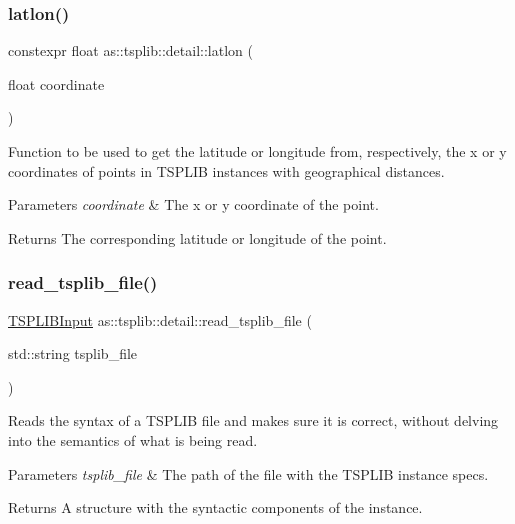 \subsubsection{\texorpdfstring{latlon()}{latlon()}}
{\footnotesize\ttfamily constexpr float as\+::tsplib\+::detail\+::latlon (\begin{DoxyParamCaption}\item[{float}]{coordinate }\end{DoxyParamCaption})\hspace{0.3cm}{\ttfamily [inline]}}



Function to be used to get the latitude or longitude from, respectively, the x or y coordinates of points in T\+S\+P\+L\+IB instances with geographical distances. 


\begin{DoxyParams}{Parameters}
{\em coordinate} & The x or y coordinate of the point. \\
\hline
\end{DoxyParams}
\begin{DoxyReturn}{Returns}
The corresponding latitude or longitude of the point. 
\end{DoxyReturn}
\mbox{\label{namespaceas_1_1tsplib_1_1detail_a3fabd21c4bc13069fbe2bcb9b6c59e74}} 
\subsubsection{\texorpdfstring{read\+\_\+tsplib\+\_\+file()}{read\_tsplib\_file()}}
{\footnotesize\ttfamily \hyperlink{classas_1_1tsplib_1_1detail_1_1TSPLIBInput}{T\+S\+P\+L\+I\+B\+Input} as\+::tsplib\+::detail\+::read\+\_\+tsplib\+\_\+file (\begin{DoxyParamCaption}\item[{std\+::string}]{tsplib\+\_\+file }\end{DoxyParamCaption})\hspace{0.3cm}{\ttfamily [inline]}}



Reads the syntax of a T\+S\+P\+L\+IB file and makes sure it is correct, without delving into the semantics of what is being read. 


\begin{DoxyParams}{Parameters}
{\em tsplib\+\_\+file} & The path of the file with the T\+S\+P\+L\+IB instance specs. \\
\hline
\end{DoxyParams}
\begin{DoxyReturn}{Returns}
A structure with the syntactic components of the instance. 
\end{DoxyReturn}
